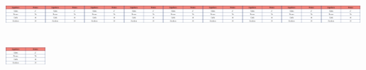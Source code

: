 \begin{escolha}
\begin{escolha}
{{{{\includegraphics[width=0.57930in,height=0.57462in]{media/image121.png}\includegraphics[width=0.57930in,height=0.57462in]{media/image121.png}\includegraphics[width=0.57930in,height=0.57462in]{media/image121.png}\includegraphics[width=0.57930in,height=0.57462in]{media/image121.png}\includegraphics[width=0.57930in,height=0.57462in]{media/image121.png}\includegraphics[width=0.57930in,height=0.57462in]{media/image121.png}\includegraphics[width=0.57930in,height=0.57462in]{media/image121.png}\includegraphics[width=0.57930in,height=0.57462in]{media/image121.png}\includegraphics[width=0.57930in,height=0.57462in]{media/image121.png}\includegraphics[width=0.57930in,height=0.57462in]{media/image121.png}

}}}}
\end{escolha}
\end{escolha}
